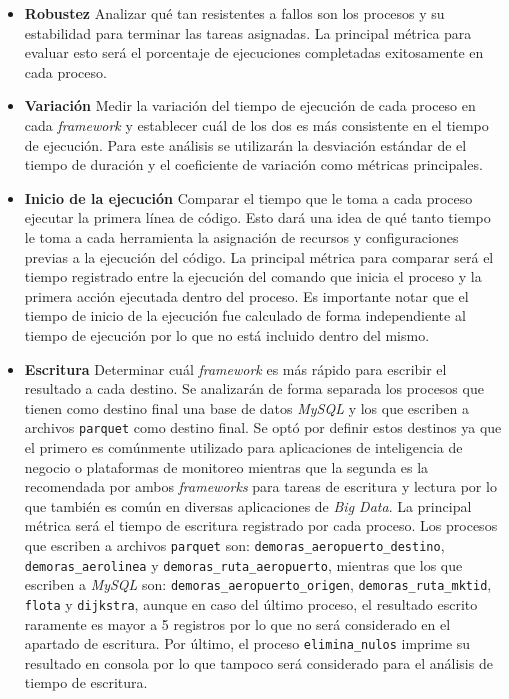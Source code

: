 \begin{itemize}
	
	\item \textbf{Robustez} Analizar qué tan resistentes a fallos son los procesos y su estabilidad para terminar las tareas asignadas. La principal métrica para evaluar esto será el porcentaje de ejecuciones completadas exitosamente en cada proceso.
	
	\item \textbf{Variación} Medir la variación del tiempo de ejecución de cada proceso en cada \textit{framework} y establecer cuál de los dos es más consistente en el tiempo de ejecución. Para este análisis se utilizarán la desviación estándar de el tiempo de duración y el coeficiente de variación como métricas principales.
	
	\item \textbf{Inicio de la ejecución} Comparar el tiempo que le toma a cada proceso ejecutar la primera línea de código. Esto dará una idea de qué tanto tiempo le toma a cada herramienta la asignación de recursos y configuraciones previas a la ejecución del código. La principal métrica para comparar será el tiempo registrado entre la ejecución del comando que inicia el proceso y la primera acción ejecutada dentro del proceso. Es importante notar que el tiempo de inicio de la ejecución fue calculado de forma independiente al tiempo de ejecución por lo que no está incluido dentro del mismo.
	
	\item \textbf{Escritura} Determinar cuál \textit{framework} es más rápido para escribir el resultado a cada destino. Se analizarán de forma separada los procesos que tienen como destino final una base de datos \textit{MySQL} y los que escriben a archivos \texttt{parquet} como destino final. Se optó por definir estos destinos ya que el primero es comúnmente utilizado para aplicaciones de inteligencia de negocio o plataformas de monitoreo mientras que la segunda es la recomendada por ambos \textit{frameworks} para tareas de escritura y lectura por lo que también es común en diversas aplicaciones de \textit{Big Data}. La principal métrica será el tiempo de escritura registrado por cada proceso. Los procesos que escriben a archivos \texttt{parquet} son: \texttt{demoras\_aeropuerto\_destino}, \texttt{demoras\_aerolinea} y \texttt{demoras\_ruta\_aeropuerto}, mientras que los que escriben a \textit{MySQL} son: \texttt{demoras\_aeropuerto\_origen}, \texttt{demoras\_ruta\_mktid}, \texttt{flota} y \texttt{dijkstra}, aunque en caso del último proceso, el resultado escrito raramente es mayor a 5 registros por lo que no será considerado en el apartado de escritura. Por último, el proceso \texttt{elimina\_nulos} imprime su resultado en consola por lo que tampoco será considerado para el análisis de tiempo de escritura.
	

\end{itemize}
